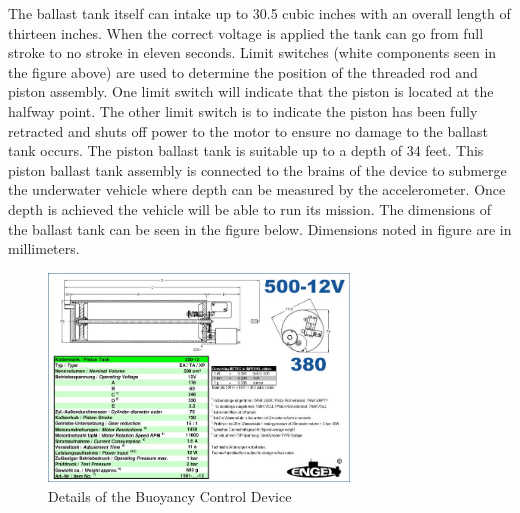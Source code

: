 \documentclass{report}
\begin{document}
The ballast tank itself can intake up to 30.5 cubic inches with an overall length of thirteen inches.  When the correct voltage is applied the tank can go from full stroke to no stroke in eleven seconds.  Limit switches (white components seen in the figure above) are used to determine the position of the threaded rod and piston assembly. One limit switch will indicate that the piston is located at the halfway point. The other limit switch is to indicate the piston has been fully retracted and shuts off power to the motor to ensure no damage to the ballast tank occurs. The piston ballast tank is suitable up to a depth of 34 feet. This piston ballast tank assembly is connected to the brains of the device to submerge the underwater vehicle where depth can be measured by the accelerometer.  Once depth is achieved the vehicle will be able to run its mission. The dimensions of the ballast tank can be seen in the figure below. Dimensions noted in figure are in millimeters.
\begin{figure}[h]
\centering
\includegraphics[width=8cm]{bcDetails}
\caption{Details of the Buoyancy Control Device}
\end{figure}
\end{document}
